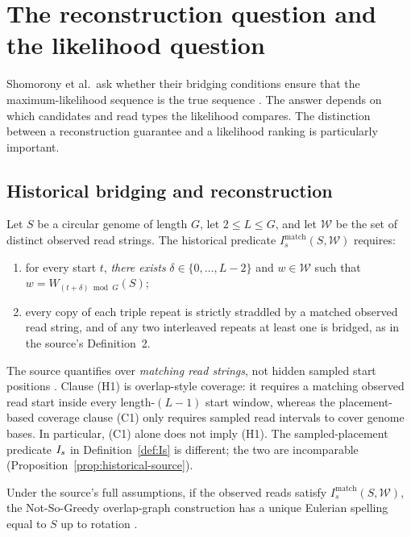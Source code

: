 \section{The reconstruction question and the likelihood question}
\label{sec:open}

Shomorony et al.\ ask whether their bridging conditions ensure that the
maximum-likelihood sequence is the true sequence
\parencite[Discussion]{shomorony2016}. The answer depends on which candidates and
read types the likelihood compares. The distinction between a reconstruction
guarantee and a likelihood ranking is particularly important.

\subsection{Historical bridging and reconstruction}

\begin{definition}
\label{def:historical-match}
Let $S$ be a circular genome of length $G$, let $2\le L\le G$, and let
$\mathcal W$ be the set of distinct observed read strings. The historical
predicate $I_s^{\mathrm{match}}(S,\mathcal W)$ requires:
\begin{enumerate}[label=(H\arabic*),leftmargin=*]
  \item for every start $t$, \emph{there exists}
  $\delta\in\{0,\ldots,L-2\}$ and $w\in\mathcal W$
  such that $w=W_{(t+\delta)\bmod G}(S)$;
  \item every copy of each triple repeat is strictly straddled by a matched
  observed read string, and of any two interleaved repeats at least one is
  bridged, as in the source's Definition~2.
\end{enumerate}
The source quantifies over \emph{matching read strings}, not hidden sampled
start positions \parencite[Supplement, \S6.4, Definitions~1--2]{shomorony2016}.
Clause (H1) is overlap-style coverage: it requires a matching
observed read start inside every length-$(L-1)$ start window, whereas
the placement-based coverage clause (C1) only requires sampled
read intervals to cover genome bases. In particular, (C1) alone
does not imply (H1).
The sampled-placement predicate $I_s$ in Definition~\ref{def:Is} is different;
the two are incomparable (Proposition~\ref{prop:historical-source}).
\end{definition}

\begin{theorem}
\label{thm:notso-greedy}
Under the source's full assumptions, if the observed reads satisfy
$I_s^{\mathrm{match}}(S,\mathcal W)$, the Not-So-Greedy overlap-graph
construction has a unique Eulerian spelling equal to $S$ up to rotation
\parencite{shomorony2016}.
\end{theorem}

